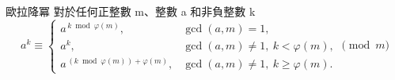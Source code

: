 歐拉降冪
對於任何正整數 m、整數 a 和非負整數 k
\[
a^k \equiv
\begin{cases}
a^{\,k \bmod \varphi(m)}, & \gcd(a,m)=1,\\[6pt]
a^k, & \gcd(a,m)\ne 1,\ k < \varphi(m),\\[6pt]
a^{\,(k \bmod \varphi(m))+\varphi(m)}, & \gcd(a,m)\ne 1,\ k \ge \varphi(m).
\end{cases}
\pmod{m}
\]
